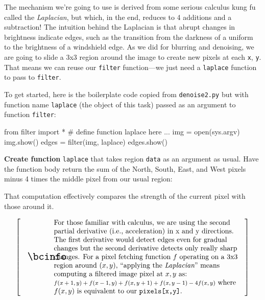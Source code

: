 \documentclass[titlepage]{tufte-book}
\makeatletter
\newenvironment{callout}[1]{
\[
  \left[
      \begin{tabular}{@{\quad}m{.05\textwidth}@{\qquad}m{.75\textwidth}@{\quad}}
        \scalebox{1.5}{#1} & 
          \raggedright%
}
{
      \end{tabular}
    \right]
\]
}
\makeatother
\begin{document}
The mechanism we're going to use is derived from some serious calculus kung fu called the {\em Laplacian}, but which, in the end, reduces to 4 additions and a subtraction!  The intuition behind the Laplacian is that abrupt changes in brightness indicate edges, such as the transition from the darkness of a uniform to the brightness of a windshield edge.  As we did for blurring and denoising, we are going to slide a 3x3 region around the image to create new pixels at each {\tt x}, {\tt y}. That  means we can reuse our {\tt filter} function---we just need a {\tt laplace} function to pass to {\tt filter}.

To get started, here is the boilerplate code copied from {\tt denoise2.py} but with function name {\tt laplace} (the object of this task) passed as an argument to function {\tt filter}:

\begin{pyverbatim}
from filter import *
# define function laplace here
...
img = open(sys.argv)
img.show()
edges = filter(img, laplace)
edges.show()
\end{pyverbatim}

{\bf Create function} {\tt laplace} that takes region {\tt data} as an argument as usual. Have the function body  return the sum of the North, South, East, and West pixels minus 4 times the middle pixel from our usual region:

\begin{center}
\end{center}

\noindent That computation effectively compares the strength of the current pixel with those around it.

\begin{callout}{\bcinfo}
For those familiar with calculus, we are using the second partial derivative (i.e., acceleration) in x and y directions. The first derivative would detect edges even for gradual changes but the second derivative detects only really sharp changes. For a pixel fetching function $f$ operating on a 3x3 region around $(x,y)$, ``applying the {\em Laplacian}'' means computing a filtered image pixel at $x,y$ as:

{\footnotesize $f(x + 1,y) + f(x - 1,y) + f(x,y + 1) + f(x,y - 1) - 4f(x, y)$}

where $f(x,y)$ is equivalent to our {\tt pixels[x,y]}.
\end{callout}
\end{document}
